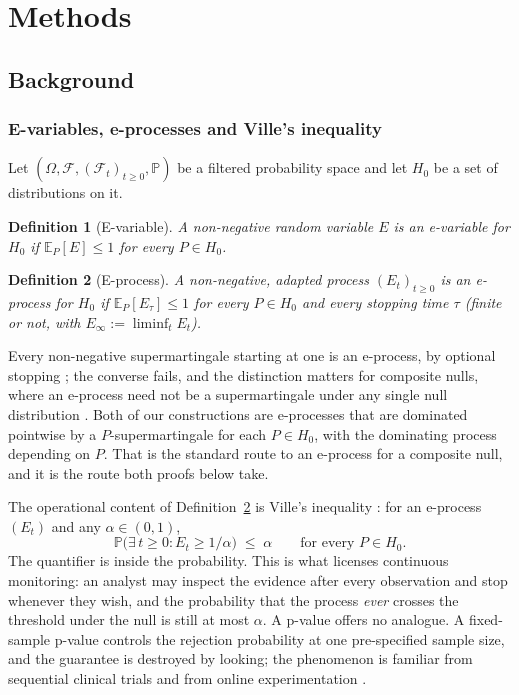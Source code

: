 \documentclass[pdflatex,sn-apa]{sn-jnl}
\theoremstyle{thmstyleone}%
\theoremstyle{thmstyletwo}%
\theoremstyle{thmstylethree}%
\newtheorem{definition}{Definition}%
\newcommand{\Fcal}{\mathcal{F}}
\newcommand{\Prob}{\mathbb{P}}
\newcommand{\Exp}{\mathbb{E}}
\begin{document}
\section{Methods}\label{sec:methods}

\subsection{Background}\label{sec:background}

\subsubsection{E-variables, e-processes and Ville's inequality}
\label{sec:eproc}

Let $(\Omega, \Fcal, (\Fcal_t)_{t \ge 0}, \Prob)$ be a filtered probability
space and let $H_0$ be a set of distributions on it.

\begin{definition}[E-variable]\label{def:evar}
A non-negative random variable $E$ is an \emph{e-variable} for $H_0$ if
$\Exp_P[E] \le 1$ for every $P \in H_0$.
\end{definition}

\begin{definition}[E-process]\label{def:eproc}
A non-negative, adapted process $(E_t)_{t \ge 0}$ is an \emph{e-process} for
$H_0$ if $\Exp_P[E_\tau] \le 1$ for every $P \in H_0$ and every stopping time
$\tau$ (finite or not, with $E_\infty := \liminf_t E_t$).
\end{definition}

Every non-negative supermartingale starting at one is an e-process, by
optional stopping \citep{shafer2019game}; the converse fails, and the distinction matters for
composite nulls, where an e-process need not be a supermartingale under any
single null distribution \citep{ramdas2023gametheoretic}. Both of our
constructions are e-processes that are dominated pointwise by a
$P$-supermartingale for each $P \in H_0$, with the dominating process
depending on $P$. That is the standard route to an e-process for a composite
null, and it is the route both proofs below take.

The operational content of Definition~\ref{def:eproc} is Ville's inequality
\citep{ville1939etude}: for an e-process $(E_t)$ and any $\alpha \in (0,1)$,
\begin{equation}\label{eq:ville}
\Prob\bigl( \exists\, t \ge 0 : E_t \ge 1/\alpha \bigr) \;\le\; \alpha
\qquad \text{for every } P \in H_0 .
\end{equation}
The quantifier is inside the probability. This is what licenses continuous
monitoring: an analyst may inspect the evidence after every observation and
stop whenever they wish, and the probability that the process \emph{ever}
crosses the threshold under the null is still at most $\alpha$. A p-value
offers no analogue. A fixed-sample p-value controls the rejection probability
at one pre-specified sample size, and the guarantee is destroyed by looking;
the phenomenon is familiar from sequential clinical trials and from online
experimentation \citep{johari2022always}.
\end{document}
